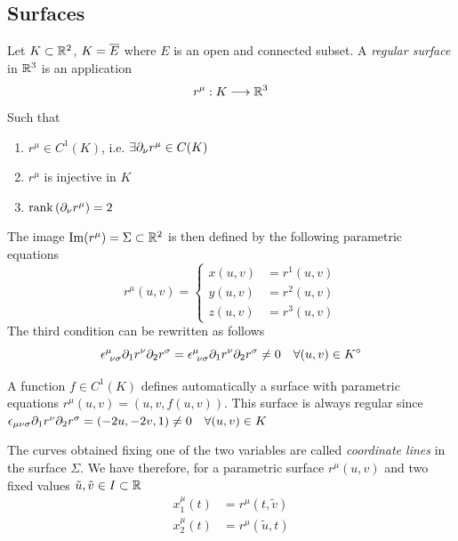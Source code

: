 \documentclass[../complete.tex]{subfiles}
\begin{document}
\subsection{Surfaces}
\begin{dfn}
	Let $K\subset\mathbb{R}^{2}$, $K=\overline{E}$ where $E$ is an open and connected subset. A \textit{regular surface} in $\mathbb{R}^3$ is an application
	\begin{equation*}
		r^\mu:K\overset{}{\longrightarrow}\mathbb{R}^3
	\end{equation*}
	Such that
	\begin{enumerate}
	\item $r^\mu\in C^1(K)$, i.e. $\exists\partial_\nu r^\mu\in C(K)$
	\item $r^\mu$ is injective in $K$
	\item $\rank\left(\partial_\nu r^\mu\right)=2$
	\end{enumerate}
	The image $\operatorname{Im}(r^\mu)=\Sigma\subset\mathbb{R}^2$ is then defined by the following parametric equations
	\begin{equation}
		r^\mu(u,v)=\left\{\begin{aligned}x(u,v)&=r^1(u,v)\\y(u,v)&=r^2(u,v)\\z(u,v)&=r^3(u,v)\end{aligned}\right.
		\label{eq:parametricsurf}
	\end{equation}
	The third condition can be rewritten as follows
	\begin{equation}
		\epsilon^\mu_{\ \nu\sigma}\del_1r^\nu\del_2r^\sigma=\epsilon^\mu_{\ \nu\sigma}\del_1r^\nu\del_2r^\sigma\ne0\quad\forall(u,v)\in\intr{K}
		\label{eq:surfregcond}
	\end{equation}
\end{dfn}
\begin{rmk}
	A function $f\in C^1(K)$ defines automatically a surface with parametric equations $r^\mu(u,v)=(u,v,f(u,v))$. This surface is always regular since $\epsilon_{\mu\nu\sigma}\partial_1r^\nu\partial_2r^\sigma=(-2u,-2v,1)\ne0\quad\forall(u,v)\in K$
\end{rmk}
\begin{dfn}
	The curves obtained fixing one of the two variables are called \textit{coordinate lines} in the surface $\Sigma$. We have therefore, for a parametric surface $r^\mu(u,v)$ and two fixed values $\tilde{u},\tilde{v}\in I\subset\mathbb{R}$
	\begin{equation}
		\begin{aligned}
			x_1^\mu(t)&=r^\mu(t,\tilde{v})\\
			x_2^\mu(t)&=r^\mu(\tilde{u},t)
		\end{aligned}
		\label{eq:coordinatelines}
	\end{equation}
\end{dfn}
\end{document}
